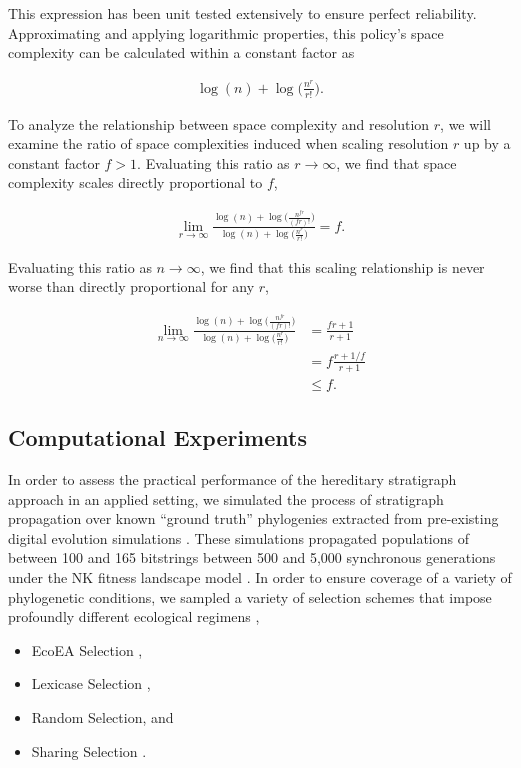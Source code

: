 This expression has been unit tested extensively to ensure perfect reliability.
Approximating and applying logarithmic properties, this policy's space complexity can be calculated within a constant factor as

\begin{align*}
\log(n) + \log\Big(\frac{n^r}{r!}\Big).
\end{align*}

To analyze the relationship between space complexity and resolution $r$, we will examine the ratio of space complexities induced when scaling resolution $r$ up by a constant factor $f > 1$.
Evaluating this ratio as $r \to \infty$, we find that space complexity scales directly proportional to $f$,

\begin{align*}
\lim_{r \to \infty}
\frac{
  \log(n) + \log\Big(\frac{n^{fr}}{(fr)!}\Big)
}{
  \log(n) + \log\Big(\frac{n^r}{r!}\Big)
}
= f.
\end{align*}

Evaluating this ratio as $n \to \infty$, we find that this scaling relationship is never worse than directly proportional for any $r$,

\begin{align*}
\lim_{n \to \infty}
\frac{
  \log(n) + \log\Big(\frac{n^{fr}}{(fr)!}\Big)
}{
  \log(n) + \log\Big(\frac{n^r}{r!}\Big)
}
&= \frac{fr+1}{r+1}\\
&= f\frac{r + 1/f}{r + 1}\\
&\leq f.
\end{align*}


\subsection{Computational Experiments}

In order to assess the practical performance of the hereditary stratigraph approach in an applied setting, we simulated the process of stratigraph propagation over known ``ground truth'' phylogenies extracted from pre-existing digital evolution simulations \citep{hernandez2022phylogenetic}.
These simulations propagated populations of between 100 and 165 bitstrings between 500 and 5,000 synchronous generations under the NK fitness landscape model \citep{kauffman1989nk}.
In order to ensure coverage of a variety of phylogenetic conditions, we sampled a variety of selection schemes that impose profoundly different ecological regimens \citep{dolson2018ecological},
\begin{itemize}
  \item EcoEA Selection \citep{goings2012ecology},
  \item Lexicase Selection \citep{helmuth2014solving},
  \item Random Selection, and
  \item Sharing Selection \citep{goldberg1987genetic}.
\end{itemize}

